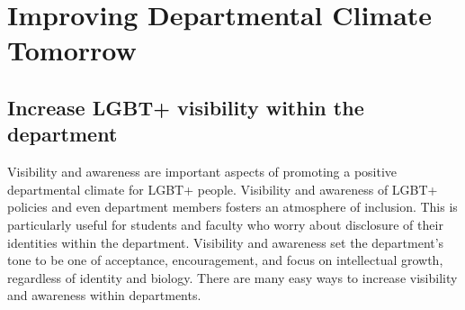 %

\chapter{Improving Departmental Climate Tomorrow}	%
\label{climate-tomorrow}		%
\normalsize			%


\section {Increase LGBT+ visibility within the department}
\label{visibility}
Visibility and awareness are important aspects of promoting a positive departmental climate for LGBT+ people. Visibility and awareness of LGBT+ policies and even department members fosters an atmosphere of inclusion. This is particularly useful for students and faculty who worry about disclosure of their identities within the department. Visibility and awareness set the department's tone to be one of acceptance, encouragement, and focus on intellectual growth, regardless of identity and biology. There are many easy ways to increase visibility and awareness within departments.

